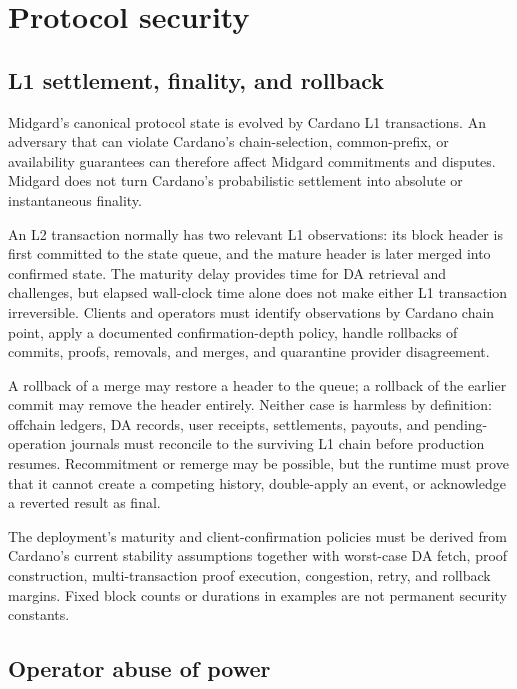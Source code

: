 \documentclass[../midgard.tex]{subfiles}
\begin{document}
\section{Protocol security}
\label{h:protocol-security}

\subsection{L1 settlement, finality, and rollback}
\label{h:malicious-majority-stake-attack}

Midgard's canonical protocol state is evolved by Cardano L1 transactions.
An adversary that can violate Cardano's chain-selection, common-prefix, or availability guarantees can therefore affect Midgard commitments and disputes.
Midgard does not turn Cardano's probabilistic settlement into absolute or instantaneous finality.

An L2 transaction normally has two relevant L1 observations: its block header is first committed to the state queue, and the mature header is later merged into confirmed state.
The maturity delay provides time for DA retrieval and challenges, but elapsed wall-clock time alone does not make either L1 transaction irreversible.
Clients and operators must identify observations by Cardano chain point, apply a documented confirmation-depth policy, handle rollbacks of commits, proofs, removals, and merges, and quarantine provider disagreement.

A rollback of a merge may restore a header to the queue; a rollback of the earlier commit may remove the header entirely.
Neither case is harmless by definition: offchain ledgers, DA records, user receipts, settlements, payouts, and pending-operation journals must reconcile to the surviving L1 chain before production resumes.
Recommitment or remerge may be possible, but the runtime must prove that it cannot create a competing history, double-apply an event, or acknowledge a reverted result as final.

The deployment's maturity and client-confirmation policies must be derived from Cardano's current stability assumptions together with worst-case DA fetch, proof construction, multi-transaction proof execution, congestion, retry, and rollback margins.
Fixed block counts or durations in examples are not permanent security constants.

\subsection{Operator abuse of power}
\label{h:operator-abuse-of-power}
\end{document}
